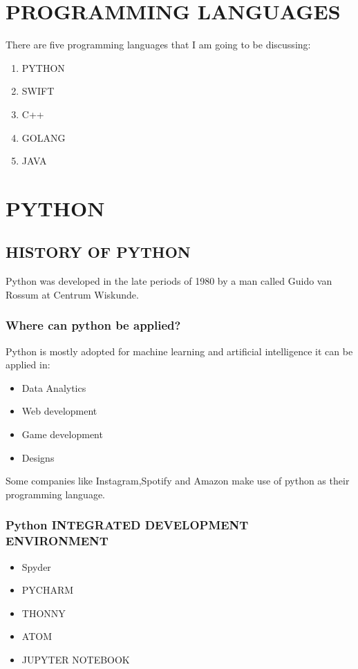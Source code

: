\documentclass{article}
\begin{document}
	\section{PROGRAMMING LANGUAGES}
	There are five programming languages that I am going to be discussing: 
	\begin{enumerate}
		\item PYTHON
		\item SWIFT
		\item C++
		\item GOLANG
		\item JAVA
	\end{enumerate}
\section{PYTHON}
\subsection{HISTORY OF PYTHON}
Python was developed in the late periods of 1980 by a man called Guido van Rossum  at Centrum Wiskunde.
\subsubsection{Where can python be applied?}
Python is mostly adopted for machine learning and artificial intelligence it can be applied in:
\begin{itemize}
	\item Data Analytics
	\item Web development
	\item Game development
	\item Designs
\end{itemize}
	Some companies like Instagram,Spotify and Amazon make use of python as their programming language. 
	\subsubsection{Python INTEGRATED DEVELOPMENT ENVIRONMENT}
	\begin{itemize}
		\item Spyder
		\item PYCHARM
		\item THONNY
		\item ATOM
		\item JUPYTER NOTEBOOK
	\end{itemize}	
		
\end{document}
